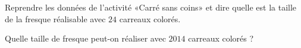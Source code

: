 
\begin{exercice}\label{exosmath-0936}

    Reprendre les données de l'activité «Carré sans coins» et dire quelle est la taille de la fresque réalisable avec \( 24\) carreaux colorés.

    Quelle taille de fresque peut-on réaliser avec \( 2014\) carreaux colorés ?

\end{exercice}
